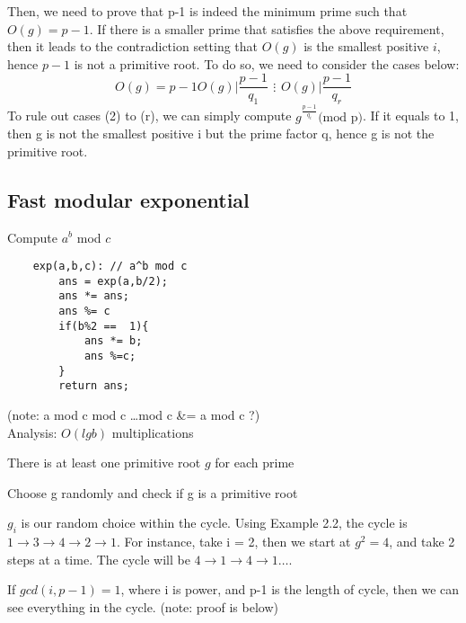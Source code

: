 \documentclass[../main.tex]{subfile}
\begin{document}
 Then, we need to prove that p-1 is indeed the minimum prime such that $O(g) = p-1$. If there is a smaller prime that satisfies the above requirement, then it leads to the contradiction setting that $O(g)$ is the smallest positive $i$, hence $p-1$ is not a primitive root. To do so, we need to consider the cases below:
  \[
		\begin{equation}
		O(g) = p-1
		\end{equation}
		\begin{equation}
		O(g) | \frac{p-1}{q_{1}} 
		\end{equation}
		\begin{align*}
			\vdots 
		\end{align*}
		\begin{equation}\tag{r}
		O(g) | \frac{p-1}{q_{r}}
		\end{equation}
  \] 
	To rule out cases (2) to (r), we can simply compute $g^{\frac{p-1}{q_{i}}} \text{(mod p)}$. If it equals to 1, then g is not the smallest positive i but the prime factor q, hence g is not the primitive root.

	\subsection{Fast modular exponential}
	\begin{task}
		Compute $a^b$ mod $c$
	\end{task}
	\begin{lstlisting}
	exp(a,b,c): // a^b mod c
		ans = exp(a,b/2);
		ans *= ans;
		ans %= c
		if(b%2 ==  1){
			ans *= b;
			ans %=c;
		}
		return ans;
\end{lstlisting}
	(note: a mod c mod c \ldots mod c &=  a mod c ?) \\ Analysis: $O(lg b)$ multiplications

	\begin{theorem}
	There is at least one primitive root $g$ for each prime	
	\end{theorem}
	
	\begin{example}
Choose g randomly and check if g is a primitive root
	\end{example}
	$g_{i}$ is our random choice within the cycle. Using Example 2.2, the cycle is $1\to 3\to 4\to 2\to 1$.
	For instance, take i = 2, then we start at $g^2 = 4$, and take 2 steps at a time. The cycle will be $4\to 1\to 4\to 1\ldots$. 

	\begin{theorem}
		If $gcd(i, p-1) = 1$, where i is power, and p-1 is the length of cycle, then we can see everything in the cycle.	(note: proof is below)
	\end{theorem}
\end{document}
